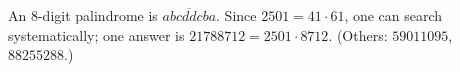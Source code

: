 An $8$-digit palindrome is $\overline{abcddcba}$. Since $2501=41\cdot61$, one can search systematically; one answer is $\boxed{21788712}=2501\cdot8712$. (Others: $59011095$, $88255288$.)
